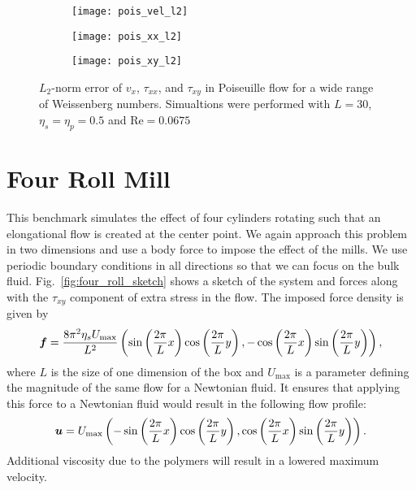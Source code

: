 \begin{figure}[htbp]
	\centering
	\begin{subfigure}{0.5\linewidth}
	\texttt{[image: pois\_vel\_l2]}
	\label{fig:stressxx_roll}
\end{subfigure}\medskip
\begin{subfigure}{0.5\linewidth}
	\texttt{[image: pois\_xx\_l2]}
	\label{fig:stressxy_roll}
\end{subfigure}\hfill
\begin{subfigure}{0.5\linewidth}
	\texttt{[image: pois\_xy\_l2]}
	\label{fig:stressyy_roll}
\end{subfigure}
\caption{$L_2$-norm error of $v_x$, $\tau_{xx}$, and $\tau_{xy}$ in Poiseuille flow for a wide range of Weissenberg numbers. Simualtions were performed with $L = 30$, $\eta_s = \eta_p = 0.5$ and $\mathrm{Re} = 0.0675$}
\label{fig:pois_error}
\end{figure}



\section{Four Roll Mill}
This benchmark simulates the effect of four cylinders rotating such that an elongational flow is created at the center point. We again approach this problem in two dimensions and use a body force to impose the effect of the mills. We use periodic boundary conditions in all directions so that we can focus on the bulk fluid. Fig.~\ref{fig:four_roll_sketch} shows a sketch of the system and forces along with the $\tau_{xy}$ component of extra stress in the flow. The imposed force density is given by
\begin{equation}\label{eq:four_mill_force}
\bm{f} = \frac{8\pi^2  \eta_s U_{\mathrm{max}}}{L^2}\left(\sin\left(\frac{2\pi}{L} x\right)\cos\left(\frac{2\pi}{L} y\right), -\cos\left(\frac{2\pi}{L} x\right)\sin\left(\frac{2\pi}{L} y\right)\right),
\end{equation}
where $L$ is the size of one dimension of the box and $U_\mathrm{max}$ is a parameter defining the magnitude of the same flow for a Newtonian fluid. It ensures that applying this force to a Newtonian fluid would result in the following flow profile:
\begin{equation}
\bm{u} = U_\mathrm{max}\left(-
\sin\left(\frac{2\pi}{L} x\right)\cos\left(\frac{2\pi}{L} y\right), \cos\left(\frac{2\pi}{L} x\right)\sin\left(\frac{2\pi}{L} y\right)\right).
\end{equation}
Additional viscosity due to the polymers will result in a lowered maximum velocity.


